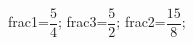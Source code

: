 \documentclass[exercice]{thedocument}%
\begin{document}
%
    \>frac1=$\dfrac54$;%
    \>frac3=$\dfrac52$;%
    \>frac2=$\dfrac{15}{8}$;%
\end{document}
